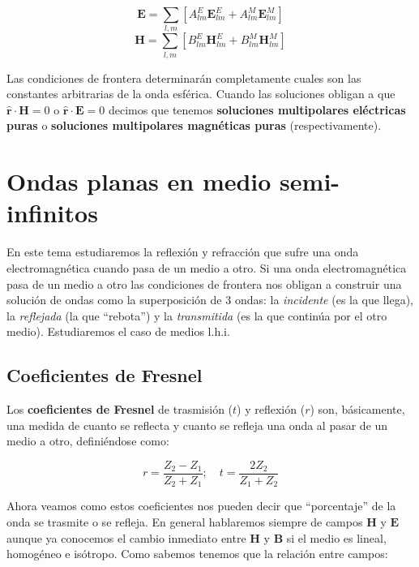 \documentclass[12pt,a4paper]{article}
\newcommand{\ccorchetes}[1]{\left[ #1  \right]}
\newcommand{\Bn}{\mathbf{B}}
\newcommand{\En}{\mathbf{E}}
\newcommand{\Hn}{\mathbf{H}}
\newcommand{\hnr}{\hat{\mathbf{r}}}
\numberwithin{equation}{section}
\numberwithin{figure}{section}
\begin{document}
\begin{equation}
\En = \sum_{l,m} \ccorchetes{A_{lm}^E \En_{lm}^E+A_{lm}^M \En_{lm}^M}
\end{equation}
\begin{equation}
\Hn = \sum_{l,m} \ccorchetes{B_{lm}^E \Hn_{lm}^E+B_{lm}^M \Hn_{lm}^M}
\end{equation}

Las condiciones de frontera determinarán completamente cuales son las constantes arbitrarias de la onda esférica. Cuando las soluciones obligan a que $\hnr \cdot \Hn = 0$  o $\hnr \cdot \En = 0$ decimos que tenemos \textbf{soluciones multipolares eléctricas puras} o \textbf{soluciones multipolares magnéticas puras} (respectivamente).

\newpage

\section{Ondas planas en medio semi-infinitos}

En este tema estudiaremos la reflexión y refracción que sufre una onda electromagnética cuando pasa de un medio a otro. Si una onda electromagnética pasa de un medio a otro las condiciones de frontera nos obligan a construir una solución de ondas como la superposición de 3 ondas: la \textit{incidente} (es la que llega), la \textit{reflejada} (la que ``rebota'') y la \textit{transmitida} (es la que continúa por el otro medio). Estudiaremos el caso de medios l.h.i. 

\subsection{Coeficientes de Fresnel}

Los \textbf{coeficientes de Fresnel} de trasmisión ($t$) y reflexión ($r$) son, básicamente, una medida de cuanto se reflecta y cuanto se refleja una onda al pasar de un medio a otro, definiéndose como:

\begin{equation}
r = \dfrac{Z_2 - Z_1}{Z_2 + Z_1}; \quad t = \dfrac{2Z_2}{Z_1 + Z_2}
\end{equation}

Ahora veamos como estos coeficientes nos pueden decir que ``porcentaje'' de la onda se trasmite o se refleja. En general hablaremos siempre de campos $\Hn$ y $\En$ aunque ya conocemos el cambio inmediato entre $\Hn$ y $\Bn$ si el medio es lineal, homogéneo e isótropo. Como sabemos tenemos que la relación entre campos:
\end{document}
